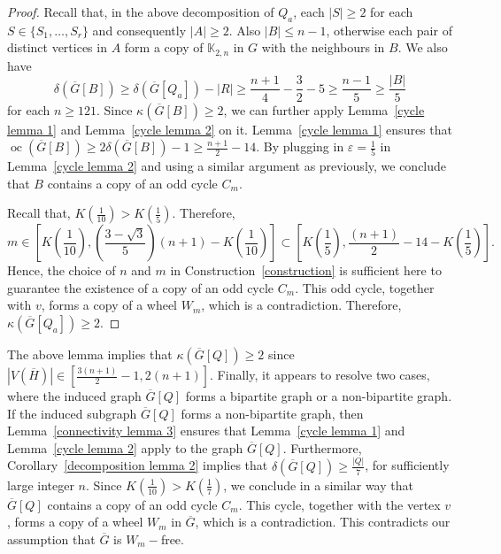 \documentclass[reqno,10pt]{amsart}
\theoremstyle{definition}
\begin{document}
\begin{proof}
Recall that, in the above decomposition of $Q_{a}$, each $|S|\geq 2$ for each $S\in\{S_{1},\ldots,S_{r}\}$  and consequently $|A|\geq 2$. Also $|B|\leq n-1$, otherwise each pair of distinct vertices in $A$ form a copy of $\mathbb{K}_{2,n}$ in $G$ with the neighbours in $B$. We also have 
\begin{equation*}
    \delta(\overline{G}[B])\geq \delta(\overline{G}[Q_{a}])-|R|\geq \frac{n+1}{4}-\frac{3}{2}-5\geq \frac{n-1}{5}\geq \frac{|B|}{5} 
\end{equation*}
for each $n\geq 121$. Since $\kappa(\overline{G}[B])\geq 2$, we can further apply Lemma~\ref{cycle lemma 1} and Lemma~\ref{cycle lemma 2} on it. Lemma~\ref{cycle lemma 1} ensures that $\mathop{oc}(\overline{G}[B])\geq 2\delta(\overline{G}[B])-1\geq \frac{n+1}{2}-14$. By plugging in $\varepsilon =\frac{1}{5}$ in Lemma~\ref{cycle lemma 2} and using a similar argument as previously, we conclude that $B$ contains a copy of an odd cycle $C_{m}$. 

Recall that, $ K(\frac{1}{10})>K(\frac{1}{5})$. Therefore, 
\begin{equation*}
 m\in \left[K\left(\frac{1}{10}\right),\left(\frac{3-\sqrt{3}}{5}\right)(n+1)-K\left(\frac{1}{10}\right)\right]\subset \left[K\left(\frac{1}{5}\right),\frac{(n+1)}{2}-14-K\left(\frac{1}{5}\right)\right].
\end{equation*}
Hence, the choice of $n$ and $m$ in Construction~\ref{construction} is sufficient here to guarantee the existence of a copy of an odd cycle  $C_{m}$. This odd cycle, together with $v$, forms a copy of a wheel $W_{m}$, which is a contradiction. Therefore, $\kappa(\overline{G}[Q_{a}])\geq 2$.
\end{proof}

The above lemma implies that $\kappa(\overline{G}[Q])\geq 2$ since $|V(\overline{H})|\in\left[\frac{3(n+1)}{2}-1, 2(n+1)\right]$. Finally, it appears to resolve two cases, where the induced graph $\overline{G}[Q]$ forms a bipartite graph or a non-bipartite graph. If the induced subgraph $\overline{G}[Q]$ forms a non-bipartite graph, then Lemma~\ref{connectivity lemma 3} ensures that Lemma~\ref{cycle lemma 1} and Lemma~\ref{cycle lemma 2} apply to the graph $\overline{G}[Q]$. Furthermore,  Corollary~\ref{decomposition lemma 2} implies that $\delta(\overline{G}[Q])\geq \frac{|Q|}{7}$, for sufficiently large integer  $n$. Since $K(\frac{1}{10})>K(\frac{1}{7})$, we conclude in a similar way that $\overline{G}[Q]$ contains a copy of an odd cycle $C_{m}$. This cycle, together with the vertex $v$, forms a copy of a wheel $W_{m}$ in $\overline{G}$, which is a contradiction. This contradicts our assumption that $\overline{G}$ is $W_{m}-$free.
\end{document}
